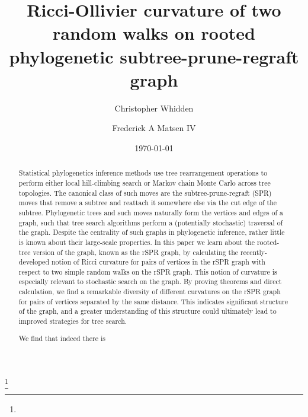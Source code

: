 \documentclass{amsart}
\begin{document}
\title[Curvature of phylogenetic subtree-prune-regraft graph]{Ricci-Ollivier curvature of two random walks on rooted phylogenetic subtree-prune-regraft graph}
\author[Whidden]{Christopher Whidden}
\author[Matsen]{Frederick A Matsen IV}
\address{}
\thanks{}

\date{\today}

\begin{abstract}
Statistical phylogenetics inference methods use tree rearrangement operations to perform either local hill-climbing search or Markov chain Monte Carlo across tree topologies.
The canonical class of such moves are the subtree-prune-regraft (SPR) moves that remove a subtree and reattach it somewhere else via the cut edge of the subtree.
Phylogenetic trees and such moves naturally form the vertices and edges of a graph, such that tree search algorithms perform a (potentially stochastic) traversal of the graph.
Despite the centrality of such graphs in phylogenetic inference, rather little is known about their large-scale properties.
In this paper we learn about the rooted-tree version of the graph, known as the rSPR graph, by calculating the recently-developed notion of Ricci curvature for pairs of vertices in the rSPR graph with respect to two simple random walks on the rSPR graph.
This notion of curvature is especially relevant to stochastic search on the graph.
By proving theorems and direct calculation, we find a remarkable diversity of different curvatures on the rSPR graph for pairs of vertices separated by the same distance.
This indicates significant structure of the graph, and a greater understanding of this structure could ultimately lead to improved strategies for tree search.

We find that indeed there is
\end{abstract}

\maketitle

\end{document}
